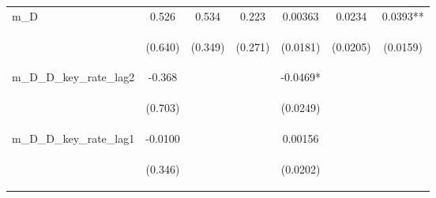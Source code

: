 \documentclass[]{article}
\begin{document}
\begin{center}
\begin{tabular}{lcccccc}
m\_D & 0.526 & 0.534 & 0.223 & 0.00363 & 0.0234 & 0.0393** \\
\vspace{4pt} & \begin{footnotesize}(0.640)\end{footnotesize} & \begin{footnotesize}(0.349)\end{footnotesize} & \begin{footnotesize}(0.271)\end{footnotesize} & \begin{footnotesize}(0.0181)\end{footnotesize} & \begin{footnotesize}(0.0205)\end{footnotesize} & \begin{footnotesize}(0.0159)\end{footnotesize} \\
m\_D\_D\_key\_rate\_lag2 & -0.368 &  &  & -0.0469* &  &  \\
\vspace{4pt} & \begin{footnotesize}(0.703)\end{footnotesize} & \begin{footnotesize}\end{footnotesize} & \begin{footnotesize}\end{footnotesize} & \begin{footnotesize}(0.0249)\end{footnotesize} & \begin{footnotesize}\end{footnotesize} & \begin{footnotesize}\end{footnotesize} \\
m\_D\_D\_key\_rate\_lag1 & -0.0100 &  &  & 0.00156 &  &  \\
\vspace{4pt} & \begin{footnotesize}(0.346)\end{footnotesize} & \begin{footnotesize}\end{footnotesize} & \begin{footnotesize}\end{footnotesize} & \begin{footnotesize}(0.0202)\end{footnotesize} & \begin{footnotesize}\end{footnotesize} & \begin{footnotesize}\end{footnotesize} \\

\end{tabular}
\end{center}
\end{document}
